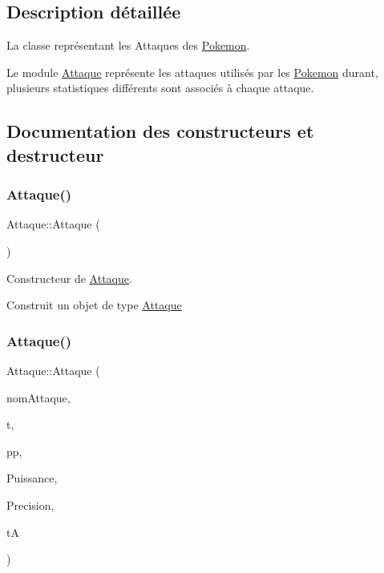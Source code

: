 \subsection{Description détaillée}
La classe représentant les Attaques des \hyperlink{class_pokemon}{Pokemon}. 

Le module \hyperlink{class_attaque}{Attaque} représente les attaques utilisés par les \hyperlink{class_pokemon}{Pokemon} durant, plusieurs statistiques différents sont associés à chaque attaque. 

\subsection{Documentation des constructeurs et destructeur}
\mbox{\label{class_attaque_a1683db1342d1d26f9fc2162ef1975b23}} 
\subsubsection{\texorpdfstring{Attaque()}{Attaque()}\hspace{0.1cm}{\footnotesize\ttfamily [1/2]}}
{\footnotesize\ttfamily Attaque\+::\+Attaque (\begin{DoxyParamCaption}{ }\end{DoxyParamCaption})}



Constructeur de \hyperlink{class_attaque}{Attaque}. 

Construit un objet de type \hyperlink{class_attaque}{Attaque} \mbox{\label{class_attaque_a1f2944283be354dcc2a19f84a537281c}} 
\subsubsection{\texorpdfstring{Attaque()}{Attaque()}\hspace{0.1cm}{\footnotesize\ttfamily [2/2]}}
{\footnotesize\ttfamily Attaque\+::\+Attaque (\begin{DoxyParamCaption}\item[{const std\+::string \&}]{nom\+Attaque,  }\item[{const \hyperlink{_attaque_8h_a1d1cfd8ffb84e947f82999c682b666a7}{Type} \&}]{t,  }\item[{unsigned int}]{pp,  }\item[{unsigned int}]{Puissance,  }\item[{unsigned int}]{Precision,  }\item[{const \hyperlink{_attaque_8h_acefba67470a7a2e69ed731d28d318e64}{Type\+Attaque} \&}]{tA }\end{DoxyParamCaption})}



